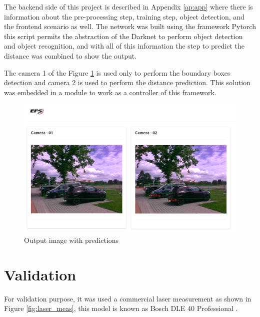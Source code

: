 The backend side of this project is described in Appendix \ref{ap:app} where there is information about the pre-processing step, training step, object detection, and the frontend scenario as well. The network was built using the framework Pytorch \cite{paszke2019pytorch} this script permits the abstraction of the Darknet to perform object detection and object recognition, and with all of this information the step to predict the distance was combined to show the output. 

The camera 1 of the Figure \ref{fig:framework_predict} is used only to perform the boundary boxes detection and camera 2 is used to perform the distance prediction. This solution was embedded in a module to work as a controller of this framework.


\begin{figure}[H]
\centering
\includegraphics[scale=0.8]{imagens/output_framework.png}
\caption{Output image with predictions }
\label{fig:framework_predict}
\end{figure}



\section{Validation}

For validation purpose, it was used a commercial laser measurement as shown in Figure \ref{fig:laser_meas}, this model is known as Bosch DLE 40 Professional {\tiny{\textregistered}}. 



